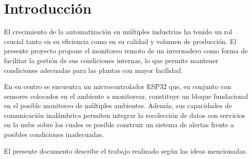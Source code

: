 \documentclass[../main]{subfiles}
\begin{document}
\section{Introducción}


El crecimiento de la automatización en múltiples industrias ha tenido un rol
crucial tanto en su eficiencia como en su calidad y volumen de producción.
El presente proyecto propone el monitoreo remoto de un invernadero como forma de
facilitar la gestión de sus condiciones internas, lo que permite mantener
condiciones adecuadas para las plantas con mayor facilidad.

En su centro se encuentra un microcontrolador ESP32 \cite{devkitv4} que, en
conjunto con sensores colocados en el ambiente a monitorear, constituye un
bloque fundacional en el posible monitoreo de múltiples ambientes.
Además, sus capacidades de comunicación inalámbrica permiten integrar la
recolección de datos con servicios en la nube sobre los cuales es posible
construir un sistema de alertas frente a posibles condiciones inadecuadas.

El presente documento describe el trabajo realizado según las ideas mencionadas.
\end{document}
